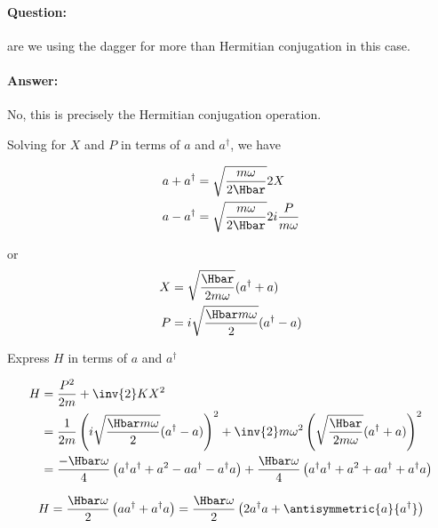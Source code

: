 \paragraph{Question:} are we using the dagger for more than Hermitian conjugation in this case.
\paragraph{Answer:} No, this is precisely the Hermitian conjugation operation.

Solving for \(X\) and \(P\) in terms of \(a\) and \(a^\dagger\), we have

\begin{equation}\label{eqn:lecture11harmonicOscillator:620}
\begin{aligned}
a + a^\dagger &= \sqrt{\frac{m \omega}{2 \Hbar}} 2 X  \\
a - a^\dagger &= \sqrt{\frac{m \omega}{2 \Hbar}} 2 i \frac{P }{m \omega}
\end{aligned}
\end{equation}

or
\begin{equation}\label{eqn:PHY356FLecture11:30}
\begin{aligned}
X &= \sqrt{\frac{\Hbar}{2 m \omega}} (a^\dagger + a) \\
P &= i \sqrt{\frac{\Hbar m \omega}{2}} (a^\dagger -a)
\end{aligned}
\end{equation}

Express \(H\) in terms of \(a\) and \(a^\dagger\)

\begin{equation}\label{eqn:lecture11harmonicOscillator:640}
\begin{aligned}
H
&= \frac{P^2}{2m} + \inv{2} K X^2  \\
&=
\frac{1}{2m} \left(
i \sqrt{\frac{\Hbar m \omega}{2}} (a^\dagger -a)
\right)^2
+ \inv{2} m \omega^2
\left(
\sqrt{\frac{\Hbar}{2 m \omega}} (a^\dagger + a)
\right)^2 \\
&=
\frac{-\Hbar \omega}{4} \left(
a^\dagger a^\dagger + a^2 - a a^\dagger - a^\dagger a
\right)
+ \frac{\Hbar \omega}{4}
\left(
a^\dagger a^\dagger + a^2 + a a^\dagger + a^\dagger a
\right) \\
\end{aligned}
\end{equation}

\begin{equation}\label{eqn:PHY356FLecture11:66}
H
=
\frac{\Hbar \omega}{2} \left(
a a^\dagger + a^\dagger a
\right)
=
\frac{\Hbar \omega}{2} \left(
2 a^\dagger a + \antisymmetric{a}{a^\dagger}
\right)
\end{equation}

